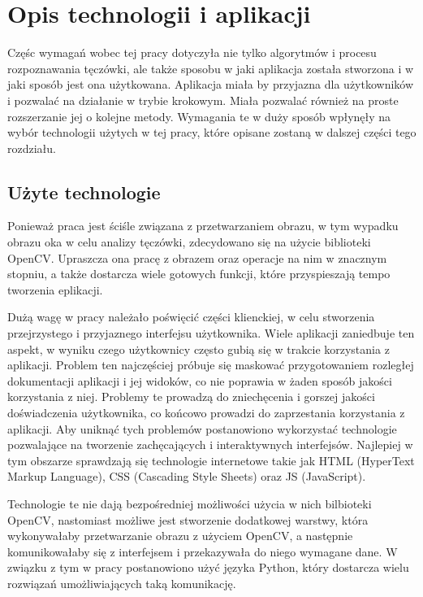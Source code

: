 \chapter{Opis technologii i aplikacji}

Częśc wymagań wobec tej pracy dotyczyła nie tylko algorytmów i procesu rozpoznawania
tęczówki, ale także sposobu w jaki aplikacja została stworzona i w jaki sposób jest
ona użytkowana. Aplikacja miała by przyjazna dla użytkowników i pozwala\'c na działanie
w trybie krokowym. Miała pozwala\'c również na proste rozszerzanie jej o kolejne
metody. Wymagania te w duży sposób wpłynęły na wybór technologii użytych w tej pracy,
które opisane zostaną w dalszej części tego rozdziału.

\section{Użyte technologie}

Ponieważ praca jest ściśle związana z przetwarzaniem obrazu, w tym wypadku obrazu oka
w celu analizy tęczówki, zdecydowano się na użycie biblioteki OpenCV. Upraszcza ona pracę
z obrazem oraz operacje na nim w znacznym stopniu, a także dostarcza wiele gotowych
funkcji, które przyspieszają tempo tworzenia eplikacji.\newline

Dużą wagę w pracy należało poświęci\'c części klienckiej, w celu stworzenia przejrzystego i
przyjaznego interfejsu użytkownika. Wiele aplikacji zaniedbuje ten aspekt, w wyniku czego
użytkownicy często gubią się w trakcie korzystania z aplikacji. Problem ten najczęściej próbuje
się maskowa\'c przygotowaniem rozległej dokumentacji aplikacji i jej widoków, co nie poprawia
w żaden sposób jakości korzystania z niej. Problemy te prowadzą do zniechęcenia i gorszej jakości
doświadczenia użytkownika, co końcowo prowadzi do zaprzestania korzystania z aplikacji. Aby
unikną\'c tych problemów postanowiono wykorzysta\'c technologie pozwalające na tworzenie
zachęcających i interaktywnych interfejsów. Najlepiej w tym obszarze sprawdzają się technologie
internetowe takie jak HTML (HyperText Markup Language), CSS (Cascading Style Sheets) oraz JS
(JavaScript).

Technologie te nie dają bezpośredniej możliwości użycia w nich bilbioteki OpenCV, nastomiast
możliwe jest stworzenie dodatkowej warstwy, która wykonywałaby przetwarzanie obrazu z
użyciem OpenCV, a następnie komunikowałaby się z interfejsem i przekazywała do niego
wymagane dane. W związku z tym w pracy postanowiono uży\'c języka Python, który dostarcza wielu
rozwiązań umożliwiających taką komunikację.\newline

